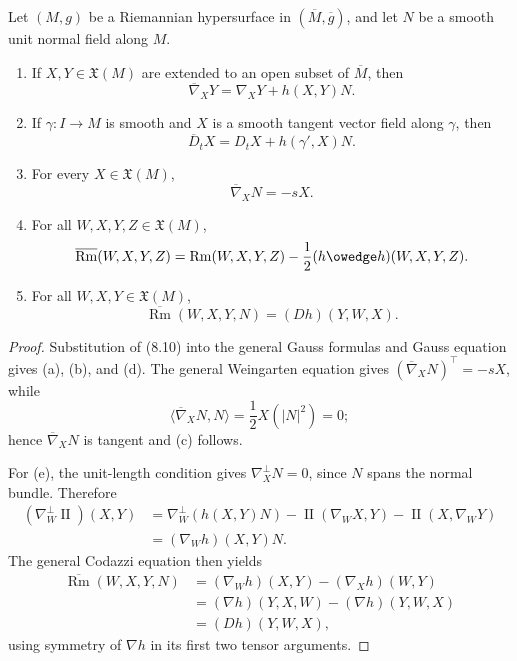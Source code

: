 \begin{theorem}
\label{thm:fundamental-equations-hypersurface}
Let $(M,g)$ be a Riemannian hypersurface in $(\overline M,\overline g)$, and
let $N$ be a smooth unit normal field along $M$.
\begin{enumerate}
\item[(a)] If $X,Y\in\mathfrak X(M)$ are extended to an open subset of
$\overline M$, then
\[
\overline\nabla_XY=\nabla_XY+h(X,Y)N.
\]
\item[(b)] If $\gamma\colon I\to M$ is smooth and $X$ is a smooth tangent
vector field along $\gamma$, then
\[
\overline D_tX=D_tX+h(\gamma',X)N.
\]
\item[(c)] For every $X\in\mathfrak X(M)$,
\begin{equation}
\overline\nabla_XN=-sX. \tag{8.11}
\end{equation}
\item[(d)] For all $W,X,Y,Z\in\mathfrak X(M)$,
\[
\overline{\operatorname{Rm}}(W,X,Y,Z)
=\operatorname{Rm}(W,X,Y,Z)-\frac12(h\owedge h)(W,X,Y,Z).
\]
\item[(e)] For all $W,X,Y\in\mathfrak X(M)$,
\begin{equation}
\overline{\operatorname{Rm}}(W,X,Y,N)=(Dh)(Y,W,X). \tag{8.12}
\end{equation}
\end{enumerate}
\end{theorem}

\begin{proof}
\sketch Substitution of (8.10) into the general Gauss formulas and Gauss
equation gives (a), (b), and (d). The general Weingarten equation gives
$(\overline\nabla_XN)^\top=-sX$, while
\[
\langle\overline\nabla_XN,N\rangle
=\frac12X(|N|^2)=0;
\]
hence $\overline\nabla_XN$ is tangent and (c) follows.

For (e), the unit-length condition gives
$\nabla_X^\perp N=0$, since $N$ spans the normal bundle. Therefore
\begin{align*}
(\nabla_W^\perp\operatorname{II})(X,Y)
&=\nabla_W^\perp(h(X,Y)N)
  -\operatorname{II}(\nabla_WX,Y)
  -\operatorname{II}(X,\nabla_WY)\\
&=(\nabla_Wh)(X,Y)N.
\end{align*}
The general Codazzi equation then yields
\begin{align*}
\overline{\operatorname{Rm}}(W,X,Y,N)
&=(\nabla_Wh)(X,Y)-(\nabla_Xh)(W,Y)\\
&=(\nabla h)(Y,X,W)-(\nabla h)(Y,W,X)\\
&=(Dh)(Y,W,X),
\end{align*}
using symmetry of $\nabla h$ in its first two tensor arguments.
\end{proof}

